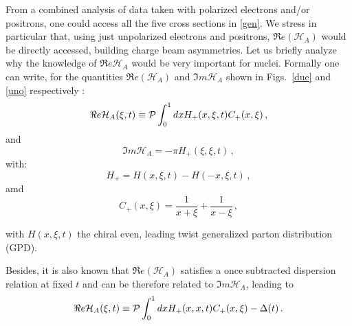 \documentclass[times, twoside]{PosWhiPap}
\begin{document}
From a combined analysis of data taken with polarized electrons and/or 
positrons, one could access all the five cross sections in \eqref{gen}.
{We stress in particular that, using just unpolarized electrons and positrons, $\Re 
e(\mathcal{H}_{A})$ would be directly accessed, building charge beam asymmetries}. Let us briefly 
analyze why the knowledge of $\Re e\mathcal{H}_{A}$ would be very
important for nuclei. Formally one can write,
for the quantities $\Re e(\mathcal{H}_{A})$ and $\Im m \mathcal{H}_{A}$
shown in Figs.~\ref{due} and \ref{uno} respectively \cite{Guidal:2013rya}:
\begin{equation}
\Re e \mathcal{H}_{A} (\xi,t) \equiv 
{\cal P} \int_0^1 dx H_+(x,\xi,t) C_+(x,\xi) \, ,
\label{ReC}
\end{equation}
and
\begin{equation}
  \Im m \mathcal{H}_{A} = -\pi H_+(\xi,\xi,t)  \, ,
\end{equation}
with:
\begin{equation}
    H_+ = H(x,\xi,t)-H(-x,\xi,t) \, ,
\end{equation}
amd
\begin{equation}
    C_+(x,\xi) = \frac{1}{x+\xi}+\frac{1}{x-\xi} \, ,
\end{equation}

with $H(x,\xi,t)$ the chiral even, leading twist generalized parton distribution
(GPD).


Besides, it is also known that $\Re e(\mathcal{H}_{A})$ satisfies a once 
subtracted dispersion relation at fixed $t$ and can be therefore related
to $\Im m \mathcal{H}_{A}$, leading to 
\cite{Anikin:2007yh,Diehl:2007jb,Radyushkin:2011dh,Pasquini:2014vua}
\begin{equation}
\Re e \mathcal{H}_{A} (\xi,t) \equiv
{\cal P} \int_0^1 dx H_+(x,x,t) C_+(x,\xi)
- \Delta(t) \, .
\label{disp}
\end{equation}
\end{document}
